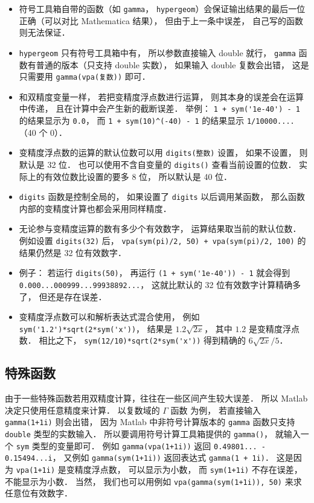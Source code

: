 \begin{itemize}
\item 符号工具箱自带的函数（如 \verb|gamma|， \verb|hypergeom|）会保证输出结果的最后一位正确（可以对比 Mathematica 结果）， 但由于上一条中误差， 自己写的函数则无法保证．

\item \verb|hypergeom| 只有符号工具箱中有， 所以参数直接输入 double 就行， \verb|gamma| 函数有普通的版本（只支持 double 实数）， 如果输入 double 复数会出错， 这是只需要用 \verb|gamma(vpa(复数))| 即可．

\item 和双精度变量一样， 若把变精度浮点数进行运算， 则其本身的误差会在运算中传递， 且在计算中会产生新的截断误差． 举例： \verb|1 + sym('1e-40') - 1| 的结果显示为 \verb|0.0|， 而 \verb|1 + sym(10)^(-40) - 1| 的结果显示 \verb|1/10000....|（40 个 0）．

\item 变精度浮点数的运算的默认位数可以用 \verb|digits(整数)| 设置， 如果不设置， 则默认是 32 位． 也可以使用不含自变量的 \verb|digits()| 查看当前设置的位数． 实际上的有效位数比设置的要多 8 位， 所以默认是 40 位．

\item \verb|digits| 函数是控制全局的， 如果设置了 \verb|digits| 以后调用某函数， 那么函数内部的变精度计算也都会采用同样精度．

\item 无论参与变精度运算的数有多少个有效数字， 运算结果取当前的默认位数． 例如设置 \verb|digits(32)| 后， \verb|vpa(sym(pi)/2, 50) + vpa(sym(pi)/2, 100)| 的结果仍然是 32 位有效数字．

\item 例子： 若运行 \verb|digits(50)|， 再运行 \verb|(1 + sym('1e-40')) - 1| 就会得到 \verb|0.000...000999...99938892...|， 这就比默认的 32 位有效数字计算精确多了， 但还是存在误差．

\item 变精度浮点数可以和解析表达式混合使用， 例如 \verb|sym('1.2')*sqrt(2*sym('x'))|， 结果是 $1.2 \sqrt{2x}$， 其中 $1.2$ 是变精度浮点数． 相比之下， \verb|sym(12/10)*sqrt(2*sym('x'))| 得到精确的 $6\sqrt{2x}/5$．
\end{itemize}

\subsection{特殊函数}
由于一些特殊函数若用双精度计算，往往在一些区间产生较大误差． 所以 Matlab 决定只使用任意精度来计算． 以复数域的 $\Gamma$ 函数 为例， 若直接输入 \verb|gamma(1+1i)| 则会出错， 因为 Matlab 中非符号计算版本的 \verb|gamma| 函数只支持 \verb|double| 类型的实数输入． 所以要调用符号计算工具箱提供的 \verb|gamma()|， 就输入一个 \verb|sym| 类型的变量即可． 例如 \verb|gamma(vpa(1+1i))| 返回 \verb|0.49801... - 0.15494...i|， 又例如 \verb|gamma(sym(1+1i))| 返回表达式 \verb|gamma(1 + 1i)|． 这是因为 \verb|vpa(1+1i)| 是变精度浮点数， 可以显示为小数， 而 \verb|sym(1+1i)| 不存在误差， 不能显示为小数． 当然， 我们也可以用例如 \verb|vpa(gamma(sym(1+1i)), 50)| 来求任意位有效数字．
